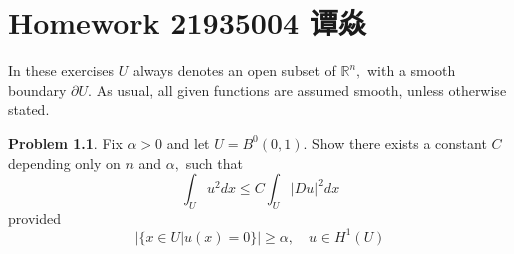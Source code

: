\documentclass[a4paper]{book}
\makeatletter
\newcommand{\voidenvironment}[1]{%
  \expandafter\providecommand\csname env@#1@save@env\endcsname{}%
  \expandafter\providecommand\csname env@#1@process\endcsname{}%
  \@ifundefined{#1}{}{\RenewEnviron{#1}{}}%
}
\numberwithin{equation}{chapter}
\theoremstyle{definition}
\newtheorem{problem}[exm]{Problem}
\newlength{\length}
\makeatother
\begin{document}
\pagestyle{empty}
% 



\setcounter{chapter}{15}




\chapter{Homework 21935004 谭焱}


In these exercises $U$ always denotes an open subset of $\mathbb{R}^{n},$ with a smooth boundary $\partial U$. As usual, all given functions are assumed smooth, unless otherwise stated.
\begin{problem}Fix $\alpha>0$ and let $U=B^{0}(0,1) .$ Show there exists a constant $C$ depending only on $n$ and $\alpha,$ such that
  \[
    \int_{U} u^{2} d x \leq C \int_{U}|D u|^{2} d x
  \]
  provided
  \[
    |\{x \in U | u(x)=0\}| \geq \alpha, \quad u \in H^{1}(U)
  \]
\end{problem}
\end{document}
